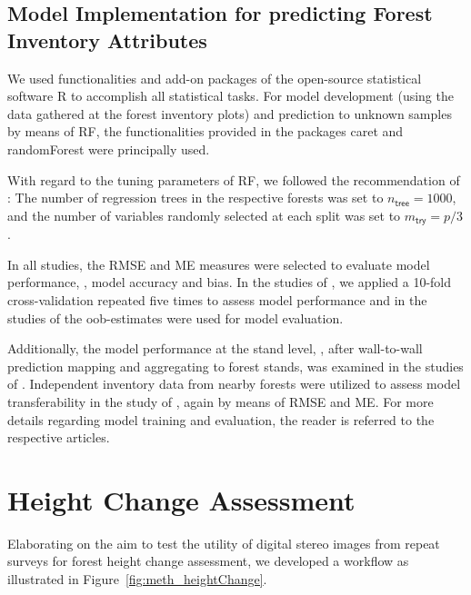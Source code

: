 \subsection{Model Implementation for predicting Forest Inventory Attributes}

We used functionalities and add-on packages of the open-source statistical software \textsf{R} to accomplish all statistical tasks.
For model development (using the data gathered at the forest inventory plots) and prediction to unknown samples by means of \ac{RF},
the functionalities provided in the packages \textsf{caret} \parencite{Kuhn.2015} and \textsf{randomForest} \parencite{Liaw.2002} were principally used. 
 
With regard to the tuning parameters of \ac{RF}, we followed the recommendation of \textcite{Kuhn.2013b}: 
The number of regression trees in the respective forests was set to $n_{\textsf{tree}} = 1000$, 
and the number of variables randomly selected at each split was set to $m_{\textsf{try}} = p/3$.

In all studies, the \acf{RMSE} and 
\acf{ME} measures were selected to evaluate model performance, \ie, model accuracy and bias.
In the studies of \textcite{Stepper.2015b,White.2015,Straub.2016}, we applied a 10-fold cross-validation repeated five times to assess model performance
and in the studies of \textcite{Immitzer.2016,Stepper.2016} the \ac{oob}-estimates were used for model evaluation.

Additionally, the model performance at the stand level, \ie, after wall-to-wall prediction mapping and aggregating to forest stands, 
was examined in the studies of \textcite{Stepper.2015b, Immitzer.2016}.
Independent inventory data from nearby forests were utilized to assess model transferability in the study of \textcite{Stepper.2016}, 
again by means of \ac{RMSE} and \ac{ME}.
For more details regarding model training and evaluation, the reader is referred to the respective articles. 


\section{Height Change Assessment}\label{sec:HeightChange}

Elaborating on the aim to test the utility of digital stereo images from repeat surveys for forest height change assessment,
we developed a workflow as illustrated in Figure~\ref{fig:meth_heightChange}.

